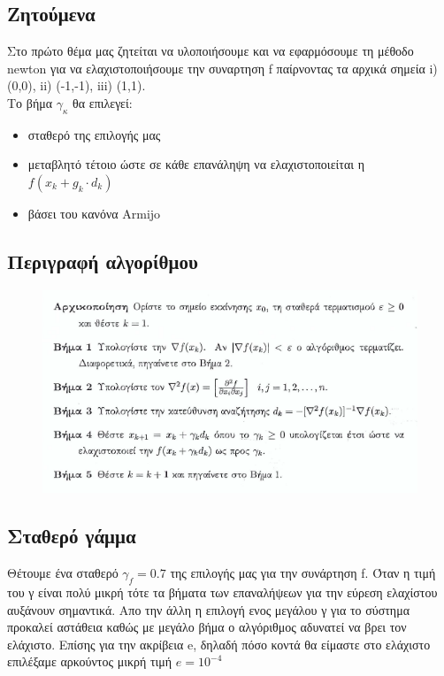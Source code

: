 \documentclass{article}
\begin{document}
\subsection*{Ζητούμενα}
Στο πρώτο θέμα μας ζητείται να υλοποιήσουμε και να εφαρμόσουμε τη μέθοδο newton για να ελαχιστοποιήσουμε την συναρτηση f  παίρνοντας τα αρχικά σημεία i) (0,0), ii) (-1,-1), iii) (1,1).\\Το βήμα $γ_κ$ θα επιλεγεί:
\begin{itemize}
\item σταθερό της επιλογής μας
\item μεταβλητό τέτοιο ώστε σε κάθε επανάληψη να ελαχιστοποιείται η $f(x_k+g_k \cdot d_k )$ 
\item  βάσει του κανόνα Armijo
\end{itemize}
\subsection*{Περιγραφή αλγορίθμου}
\begin{figure}[h!]	
     \centering  
     \advance\leftskip-0.2cm  
  \includegraphics[width=130mm,scale=2]{desc2.png}
\end{figure} 
\subsection*{Σταθερό γάμμα}
Θέτουμε ένα σταθερό $\boxed{γ_f=0.7}$ της επιλογής μας για την συνάρτηση f.  Όταν η τιμή του γ είναι πολύ μικρή τότε τα βήματα των επαναλήψεων για την εύρεση ελαχίστου αυξάνουν σημαντικά. Απο την άλλη η επιλογή ενος μεγάλου γ για το σύστημα προκαλεί αστάθεια καθώς με μεγάλο βήμα ο αλγόριθμος αδυνατεί να βρει τον ελάχιστο. Επίσης για την ακρίβεια e, δηλαδή πόσο κοντά θα είμαστε στο ελάχιστο επιλέξαμε αρκούντος μικρή τιμή $\boxed{e = 10^{-4}}$
\clearpage
\end{document}
